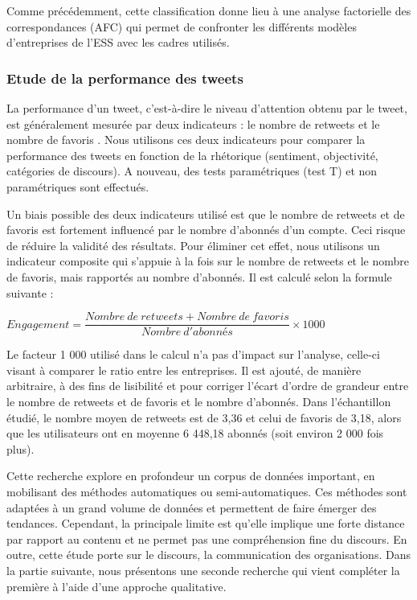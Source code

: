         Comme précédemment, cette classification donne lieu à une analyse factorielle des correspondances (AFC) qui permet de confronter les différents modèles d’entreprises de l’ESS avec les cadres utilisés.

    \subsubsection{Etude de la performance des tweets }
        \label{twitter:perf}

        La performance d'un tweet, c'est-à-dire le niveau d'attention obtenu par le tweet, est généralement mesurée par deux indicateurs : le nombre de retweets et le nombre de favoris \parencite{guo2017speaking}. Nous utilisons ces deux indicateurs pour comparer la performance des tweets en fonction de la rhétorique (sentiment, objectivité, catégories de discours). A nouveau, des tests paramétriques (test T) et non paramétriques sont effectués.

        Un biais possible des deux indicateurs utilisé est que le nombre de retweets et de favoris est fortement influencé par le nombre d'abonnés d'un compte. Ceci risque de réduire la validité des résultats. Pour éliminer cet effet, nous utilisons un indicateur composite qui s'appuie à la fois sur le nombre de retweets et le nombre de favoris, mais rapportés au nombre d'abonnés. Il est calculé selon la formule suivante : \\

            \begin{center}
                $Engagement = \dfrac{Nombre\ de\ retweets + Nombre\ de \ favoris}{Nombre\ d'abonnés} \times 1 000$ \\
            \end{center}

        Le facteur 1 000 utilisé dans le calcul n'a pas d'impact sur l'analyse, celle-ci visant à comparer le ratio entre les entreprises. Il est ajouté, de manière arbitraire, à des fins de lisibilité et pour corriger l'écart d'ordre de grandeur entre le nombre de retweets et de favoris et le nombre d'abonnés. Dans l'échantillon étudié, le nombre moyen de retweets est de 3,36 et celui de favoris de 3,18, alors que les utilisateurs ont en moyenne 6 448,18 abonnés (soit environ 2 000 fois plus).


Cette recherche explore en profondeur un corpus de données important, en mobilisant des méthodes automatiques ou semi-automatiques. Ces méthodes sont adaptées à un grand volume de données et permettent de faire émerger des tendances. Cependant, la principale limite est qu'elle implique une forte distance par rapport au contenu et ne permet pas une compréhension fine du discours. En outre, cette étude porte sur le discours, la communication des organisations. Dans la partie suivante, nous présentons une seconde recherche qui vient compléter la première à l'aide d'une approche qualitative.
